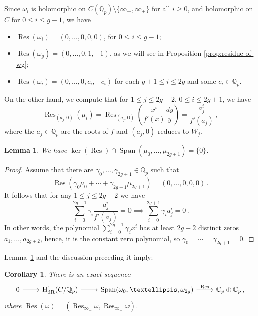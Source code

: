 \documentclass[11pt, a4paper]{amsart}
\newcommand{\Q}{\mathbb{Q}}
\newcommand{\C}{\mathbb{C}}
\newcommand{\F}{\mathbb{F}}
\newcommand{\hdr}{\operatorname{H^1_{dR}}}
\newcommand{\Span}{\operatorname{Span}}
\newcommand{\Res}{\operatorname{Res}}
\newtheorem{corollary}[theorem]{Corollary}
\newtheorem{lemma}[theorem]{Lemma}
\theoremstyle{remark}
\numberwithin{equation}{section}
\newcommand{\sg}{{}}
\newcommand{\sm}{{}}
\begin{document}
Since $\omega_i$ is holomorphic on $C(\overline{\Q}_p)\setminus \{\infty_-,\infty_+\}$ for all $i\geq 0$, and holomorphic on $C$ for $0\leq i \leq g-1$, we have
\begin{itemize}
\item $\Res(\omega_i) = (0,\ldots,0,0,0)$, for $0\leq i \leq g-1$;
\item $\Res(\omega_g) =  (0,\ldots,0,1,-1)$, as we will see in Proposition \ref{prop:residue-of-wg};
\item $\Res(\omega_i) =  (0,\ldots,0,c_i,-c_i)$ for each $g+1\leq i\leq 2g$ and some  $c_i\in \Q_p$.
\end{itemize}

On the other hand, we compute that for $1\leq j\leq 2g+2$, $0\leq i\leq
2g+1$, we have
\[
\Res_{(a_j,0)}(\mu_i)=\Res_{(a_j,0)}\left(\dfrac{x^i}{f'(x)}\dfrac{dy}{y}
\right)= \dfrac{a_j^i}{f'(a_j)}\,,
\]
\sm{where the $a_j\in \overline{\Q_p}$ are the roots of $f$ and $(a_j,0)$ reduces to $W_j$.}

\begin{lemma}\label{lm:positive-cohomology-misses-kernel}
We have $\ker(\Res)\cap \Span(\mu_0,\ldots,\mu_{2g+1}) = \{0\}$.
\end{lemma}
\begin{proof}
Assume that there are $\gamma_0,\ldots,\gamma_{2g+1}\in \Q_p$ such that
  \[\Res(\gamma_0\mu_0+\cdots+\gamma_{2g+1}\mu_{2g+1})=(0,\ldots,0,0,0)\,.\]
  It follows that for any $1\leq j\leq 2g+2$ we have
\[
\sum_{i=0}^{2g+1}\gamma_i \dfrac{a_j^i}{f'(a_j)}=0 \implies
  \sum_{i=0}^{2g+1}\gamma_i a_j^i=0\,.
\]
In other words, the polynomial $\sum_{i=0}^{2g+1}\gamma_i x^i$ has at least $2g+2$ distinct zeros $a_1,\ldots,a_{2g+2}$, hence, it is the constant zero polynomial, so $\gamma_0=\cdots=\gamma_{2g+1}=0$.
\end{proof}

Lemma~\ref{lm:positive-cohomology-misses-kernel} and the discussion
preceding it imply: 
\begin{corollary}\label{cor:exact-sequence-dr-cohomology-computation}
There is an exact sequence
\begin{equation*}\label{eq:cohomology-dR-MWminus-exact-sequence}
\begin{tikzcd}
\displaystyle    0 \arrow[r] & \hdr(C/\Q_p) \arrow[r] &
  \Span(\omega_0,\ldots,\omega_{2g}) \arrow[r, "\Res"] &
  \mathbb{C}_p\oplus \mathbb{C}_p\,,
\end{tikzcd}
\end{equation*} 
where $\Res(\omega)=(\Res_{\infty_-}\omega, \Res_{\infty_+}\omega)$.
\end{corollary}
\end{document}
